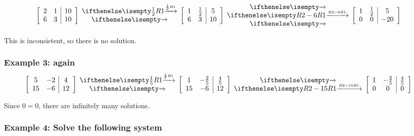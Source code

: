 \documentclass[
  letterpaper,
  DIV=11,
  numbers=noendperiod]{scrartcl}
\begin{document}

\begin{align*}
\left[\begin{array}{cc|c}2 & 1 & 10 \\ 6 & 3 & 10 \end{array}\right] \rowops{\frac{1}{2}R1,} \left[\begin{array}{cc|c}1 & \frac{1}{2} & 5 \\ 6 & 3 & 10 \end{array}\right] \rowops{,R2-6R1,} \left[\begin{array}{cc|c}1 & \frac{1}{2} & 5 \\ 0 & 0 & -20 \end{array}\right]
\end{align*}

This is inconsistent, so there is no solution.

\subsubsection{Example 3: again}\label{example-3-again}


\begin{align*}
\left[\begin{array}{cc|c}5 & -2 & 4 \\ 15 & -6 & 12\end{array}\right]\rowops{\frac{1}{5}R1,}\left[\begin{array}{cc|c}1 & -\frac{2}{5} & \frac{4}{5} \\ 15 & -6 & 12 \end{array}\right]\rowops{,R2-15R1}\left[\begin{array}{cc|c}1 & -\frac{2}{5} & \frac{4}{5} \\ 0 & 0 & 0 \end{array}\right]
\end{align*}

Since \(0 = 0\), there are infinitely many solutions.

\subsubsection{Example 4: Solve the following
system}\label{example-4-solve-the-following-system}

\end{document}
